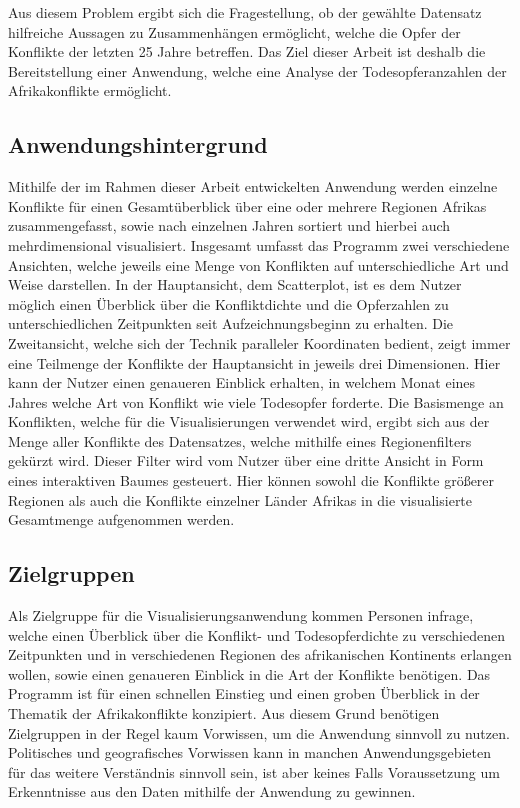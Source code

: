 \documentclass[usegeometry=true]{scrartcl}
\begin{document}
Aus diesem Problem ergibt sich die Fragestellung, ob der gewählte Datensatz hilfreiche Aussagen zu Zusammenhängen ermöglicht, welche die Opfer der Konflikte der letzten 25 Jahre betreffen. Das Ziel dieser Arbeit ist deshalb die Bereitstellung einer Anwendung, welche eine Analyse der Todesopferanzahlen der Afrikakonflikte ermöglicht.

\subsection{Anwendungshintergrund}
Mithilfe der im Rahmen dieser Arbeit entwickelten Anwendung werden einzelne Konflikte für einen Gesamtüberblick über eine oder mehrere Regionen Afrikas zusammengefasst, sowie nach einzelnen Jahren sortiert und hierbei auch mehrdimensional visualisiert. Insgesamt umfasst das Programm zwei verschiedene Ansichten, welche jeweils eine Menge von Konflikten auf unterschiedliche Art und Weise darstellen. In der Hauptansicht, dem Scatterplot, ist es dem Nutzer möglich einen Überblick über die Konfliktdichte und die Opferzahlen zu unterschiedlichen Zeitpunkten seit Aufzeichnungsbeginn zu erhalten. Die Zweitansicht, welche sich der Technik paralleler Koordinaten bedient, zeigt immer eine Teilmenge der Konflikte der Hauptansicht in jeweils drei Dimensionen. Hier kann der Nutzer einen genaueren Einblick erhalten, in welchem Monat eines Jahres welche Art von Konflikt wie viele Todesopfer forderte. Die Basismenge an Konflikten, welche für die Visualisierungen verwendet wird, ergibt sich aus der Menge aller Konflikte des Datensatzes, welche mithilfe eines Regionenfilters gekürzt wird. Dieser Filter wird vom Nutzer über eine dritte Ansicht in Form eines interaktiven Baumes gesteuert. Hier können sowohl die Konflikte größerer Regionen als auch die Konflikte einzelner Länder Afrikas in die visualisierte Gesamtmenge aufgenommen werden.

\subsection{Zielgruppen}
Als Zielgruppe für die Visualisierungsanwendung kommen Personen infrage, welche einen Überblick über die Konflikt- und Todesopferdichte zu verschiedenen Zeitpunkten und in verschiedenen Regionen des afrikanischen Kontinents erlangen wollen, sowie einen genaueren Einblick in die Art der Konflikte benötigen. Das Programm ist für einen schnellen Einstieg und einen groben Überblick in der Thematik der Afrikakonflikte konzipiert. Aus diesem Grund benötigen Zielgruppen in der Regel kaum Vorwissen, um die Anwendung sinnvoll zu nutzen. Politisches und geografisches Vorwissen kann in manchen Anwendungsgebieten für das weitere Verständnis sinnvoll sein, ist aber keines Falls Voraussetzung um Erkenntnisse aus den Daten mithilfe der Anwendung zu gewinnen.\\
\end{document}
